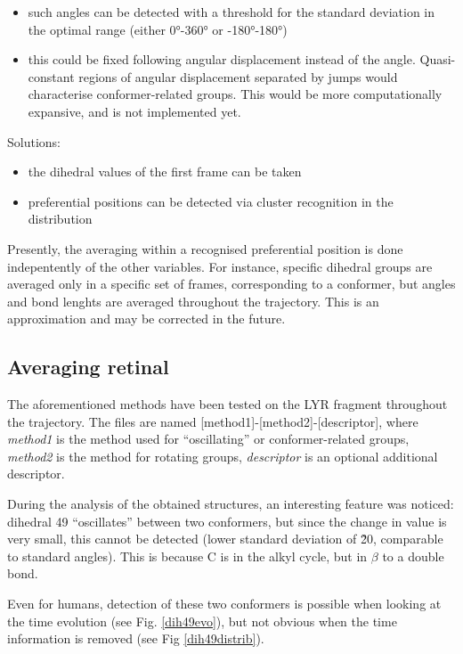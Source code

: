 \documentclass[twoside, 12pt]{article}
\begin{document}
\begin{itemize}
\begin{itemize}
 \item such angles can be detected with a threshold for the standard deviation in the optimal range (either 0°-360° or -180°-180°)
 \item this could be fixed following angular displacement instead of the angle. Quasi-constant regions of angular displacement separated by jumps would characterise conformer-related groups. This would be more computationally expansive, and is not implemented yet.
 \end{itemize}
 Solutions:
\begin{itemize}
 \item the dihedral values of the first frame can be taken 
 \item preferential positions can be detected via cluster recognition in the distribution
\end{itemize}

\end{itemize}

Presently, the averaging within a recognised preferential position is done indepentently of the other variables. For instance, specific dihedral groups are averaged only in a specific set of frames, corresponding to a conformer, but angles and bond lenghts are averaged throughout the trajectory. This is an approximation and may be corrected in the future.

\subsection{Averaging retinal}
The aforementioned methods have been tested on the LYR fragment throughout the trajectory.
The files are named [method1]-[method2]-[descriptor], where \textit{method1} is the method used for ``oscillating'' or conformer-related groups, \textit{method2} is the method for rotating groups, \textit{descriptor} is an optional additional descriptor.

During the analysis of the obtained structures, an interesting feature was noticed: dihedral 49 ``oscillates'' between two conformers, but since the change in value is very small, this cannot be detected (lower standard deviation of \~20, comparable to standard angles). This is because C is in the alkyl cycle, but in $\beta$ to a double bond.

Even for humans, detection of these two conformers is possible when looking at the time evolution (see Fig. \ref{dih49evo}), but not obvious when the time information is removed (see Fig \ref{dih49distrib}).
\end{document}
